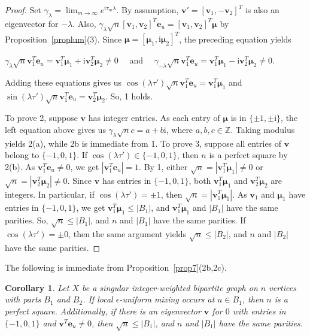 \documentclass[11pt]{article}
\newtheorem{corollary}{Corollary}
\newcommand{\be}{\mathbf e}
\newcommand{\bv}{\mathbf v}
\newcommand{\bmu}{{\boldsymbol{\mu}}}
\def\ii{\mathrm{i}}
\def\Z{\mathbb{Z}}
\begin{document}
\begin{proof}
Set $\gamma_\lambda=\lim_{m\rightarrow\infty}e^{\ii\tau_m\lambda}$. By assumption, $\bv'=[\bv_1,-\bv_2]^T$ is also an eigenvector for $-\lambda$. Also, $\gamma_\lambda\sqrt{n}[\bv_1,\bv_2]^T\be_u=[\bv_1,\bv_2]^T\bmu$ by Proposition~\ref{proplum}(3). Since $\bmu=[\bmu_1,\ii\bmu_2]^T$, the preceding equation yields
\begin{center}
$\gamma_\lambda\sqrt{n}\bv_1^T\be_u=\bv_1^T\bmu_1+\ii\bv_2^T\bmu_2\neq 0\quad $ and $\quad \gamma_{-\lambda}\sqrt{n}\bv_1^T\be_u=\bv_1^T\bmu_1-\ii\bv_2^T\bmu_2\neq 0$. 
\end{center}
Adding these equations gives us $\cos(\lambda\tau')\sqrt{n}\bv_1^T\be_u=\bv_1^T\bmu_1$ and $\sin(\lambda\tau')\sqrt{n}\bv_1^T\be_u=\bv_2^T\bmu_2.$ So, 1 holds.

To prove 2, suppose $\bv$ has integer entries. As each entry of $\bmu$ is in $\{\pm 1,\pm \ii\}$, the left equation above gives us $\gamma_\lambda\sqrt{n}c=a+b\ii$, where $a,b,c\in\Z$. Taking modulus yields 2(a), while 2b is immediate from 1. To prove 3, suppose all entries of $\bv$ belong to $\{-1,0,1\}$. If $\cos(\lambda\tau')\in\{-1,0,1\}$, then $n$ is a perfect square by 2(b). As $\bv_1^T\be_u\neq 0$, we get $|\bv_1^T\be_u|=1$. By 1, either $\sqrt{n}=|\bv_1^T\bmu_1|\neq 0$ or $\sqrt{n}=|\bv_2^T\bmu_2|\neq 0.$ Since $\bv$ has entries in $\{-1,0,1\}$, both $\bv_1^T\bmu_1$ and $\bv_2^T\bmu_2$ are integers. In particular, if $\cos(\lambda\tau')=\pm 1$, then $\sqrt{n}=|\bv_1^T\bmu_1|$. As $\bv_1$ and $\bmu_1$ have entries in $\{-1,0,1\}$, we get $\bv_1^T\bmu_1\leq |B_1|$, and $\bv_1^T\bmu_1$ and $|B_1|$ have the same parities. So, $\sqrt{n}\leq |B_1|$, and $n$ and $|B_1|$ have the same parities. If $\cos(\lambda\tau')=\pm 0$, then the same argument yields $\sqrt{n}\leq |B_2|$, and $n$ and $|B_2|$ have the same parities.
\end{proof}

The following is immediate from Proposition~\ref{prop7}(2b,2c).

\begin{corollary}
\label{cor:singularbip}
Let $X$ be a singular integer-weighted bipartite graph on $n$ vertices with parts $B_1$ and $B_2$. If local $\epsilon$-uniform mixing occurs at $u\in B_1$, then $n$ is a perfect square. Additionally, if there is an eigenvector $\bv$ for $0$ with entries in $\{-1,0,1\}$ and $\bv^T\be_u\neq 0$, then $\sqrt{n}\leq |B_1|$, and $n$ and $|B_1|$ have the same parities.
\end{corollary}
\end{document}
